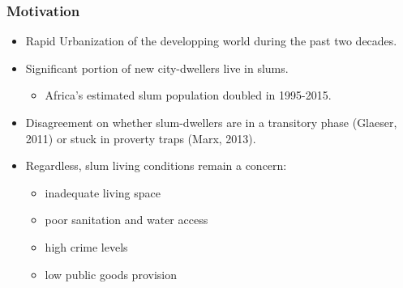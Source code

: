 \documentclass[aspectratio=149]{beamer}
\begin{document}
\begin{frame}
\frametitle{Motivation}

\begin{itemize}
\item Rapid Urbanization of the developping world during the past two decades. 
\vspace{1mm}
\vspace{1mm}
\item Significant portion of new city-dwellers live in slums.
\vspace{1mm}
\begin{itemize}
\item Africa's estimated slum population doubled in 1995-2015.
\end{itemize}
\vspace{1mm}
\item Disagreement on whether slum-dwellers are in a transitory phase (Glaeser, 2011) or stuck in proverty traps (Marx, 2013). 
\vspace{1mm}
\item Regardless, slum living conditions remain a concern:
\vspace{1mm}
\begin{itemize}
\item inadequate living space
\item poor sanitation and water access
\item high crime levels
\item low public goods provision



\end{itemize}
\vspace{1mm}
\end{itemize}

\end{frame}

\end{document}
